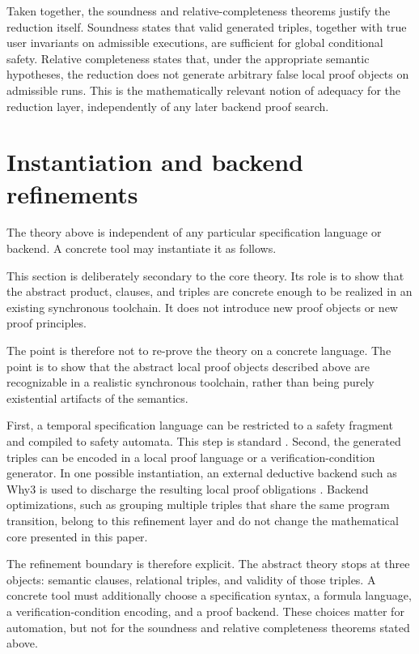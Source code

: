 \documentclass[acmsmall,screen]{acmart}
\theoremstyle{leftplain}
\theoremstyle{leftdefinition}
\theoremstyle{leftremark}
\begin{document}
Taken together, the soundness and relative-completeness theorems justify the
reduction itself. Soundness states that valid generated triples, together with
true user invariants on admissible executions, are sufficient for global
conditional safety. Relative completeness states that, under the appropriate
semantic hypotheses, the reduction does not generate arbitrary false local
proof objects on admissible runs. This is the
mathematically relevant notion of adequacy for the reduction layer,
independently of any later backend proof search.

\section{Instantiation and backend refinements}\label{sec:instantiation}
The theory above is independent of any particular specification language or
backend. A concrete tool may instantiate it as follows.

This section is deliberately secondary to the core theory. Its role is to show
that the abstract product, clauses, and triples are concrete enough to be
realized in an existing synchronous toolchain. It does not introduce new proof
objects or new proof principles.

The point is therefore not to re-prove the theory on a concrete language. The
point is to show that the abstract local proof objects described above are
recognizable in a realistic synchronous toolchain, rather than being purely
existential artifacts of the semantics.

First, a temporal specification language can be restricted to a safety fragment
and compiled to safety automata. This step is standard
\cite{kupferman-vardi-safety,gastin-oddoux}. Second, the generated triples can
be encoded in a local proof language or a verification-condition generator. In
one possible instantiation, an external deductive backend such as Why3 is used
to discharge the resulting local proof obligations \cite{why3}. Backend
optimizations, such as grouping multiple triples that share the same program
transition, belong to this refinement layer and do not change the mathematical
core presented in this paper.

The refinement boundary is therefore explicit. The abstract theory stops at
three objects: semantic clauses, relational triples, and validity of those
triples. A concrete tool must additionally choose a specification syntax, a
formula language, a verification-condition encoding, and a proof backend. These
choices matter for automation, but not for the soundness and relative
completeness theorems stated above.
\end{document}
